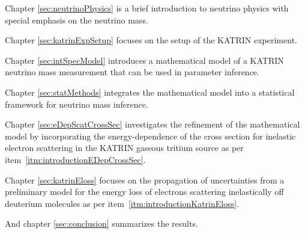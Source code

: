 Chapter \ref{sec:neutrinoPhysics} is a brief introduction to neutrino physics with special emphasis on the neutrino mass.

Chapter \ref{sec:katrinExpSetup} focuses on the setup of the KATRIN experiment.

Chapter \ref{sec:intSpecModel} introduces a mathematical model of a KATRIN neutrino mass measurement that can be used in parameter inference.

Chapter \ref{sec:statMethods} integrates the mathematical model into a statistical framework for neutrino mass inference.

Chapter \ref{sec:eDepScatCrossSec} investigates the refinement of the mathematical model by incorporating the energy-dependence of the cross section for inelastic electron scattering in the KATRIN gaseous tritium source as per item~\ref{itm:introductionEDepCrossSec}.

Chapter \ref{sec:katrinEloss} focuses on the propagation of uncertainties from a preliminary model for the energy loss of electrons scattering inelastically off deuterium molecules as per item~\ref{itm:introductionKatrinEloss}.

And chapter \ref{sec:conclusion} summarizes the results.
